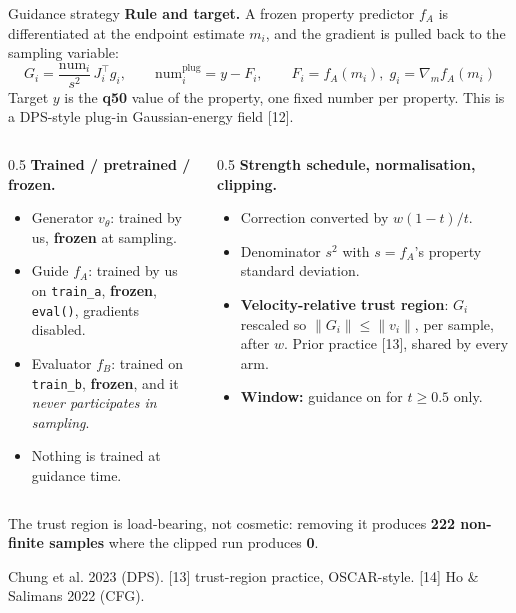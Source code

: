 \documentclass[aspectratio=169,10pt]{beamer}
\newcommand{\theslidelabel}{}
\newcommand{\lbl}[1]{\renewcommand{\theslidelabel}{#1}}
\newcommand{\srcs}[1]{\vfill{\raggedleft\color{grayt}\fontsize{4.9}{5.6}\selectfont #1\par}}
\newcommand{\take}[1]{\vspace{0.4ex}\colorbox{black!6}{\parbox{0.97\linewidth}{\footnotesize #1}}}
\begin{document}
\lbl{2b}
\begin{frame}{Guidance strategy}
  \textbf{Rule and target.} A frozen property predictor $f_A$ is differentiated at
  the endpoint estimate $m_i$, and the gradient is pulled back to the sampling
  variable:
  \[ G_i=\frac{\mathrm{num}_i}{s^2}\,J_i^{\!\top}g_i ,\qquad
     \mathrm{num}_i^{\mathrm{plug}} = y-F_i ,\qquad
     F_i=f_A(m_i),\; g_i=\nabla_m f_A(m_i) \]
  Target $y$ is the \textbf{q50} value of the property, one fixed number per
  property. This is a DPS-style plug-in Gaussian-energy field [12].

  \medskip
  \begin{columns}[T]
  \begin{column}{0.5\textwidth}
    \textbf{Trained / pretrained / frozen.}
    \begin{itemize}\setlength\itemsep{0.05em}
      \item Generator $v_\theta$: trained by us, \textbf{frozen} at sampling.
      \item Guide $f_A$: trained by us on \texttt{train\_a}, \textbf{frozen},
        \texttt{eval()}, gradients disabled.
      \item Evaluator $f_B$: trained on \texttt{train\_b}, \textbf{frozen}, and it
        \emph{never participates in sampling}.
      \item Nothing is trained at guidance time.
    \end{itemize}
  \end{column}
  \begin{column}{0.5\textwidth}
    \textbf{Strength schedule, normalisation, clipping.}
    \begin{itemize}\setlength\itemsep{0.05em}
      \item Correction converted by $w(1-t)/t$.
      \item Denominator $s^2$ with $s=f_A$'s property standard deviation.
      \item \textbf{Velocity-relative trust region}: $G_i$ rescaled so
        $\|G_i\|\le\|v_i\|$, per sample, after $w$. Prior practice [13], shared by
        every arm.
      \item \textbf{Window:} guidance on for $t\ge0.5$ only.
    \end{itemize}
  \end{column}
  \end{columns}

  \take{The trust region is load-bearing, not cosmetic: removing it produces
  \textbf{222 non-finite samples} where the clipped run produces \textbf{0}.}

  \srcs{[12] Chung et al. 2023 (DPS). [13] trust-region practice, OSCAR-style.
        [14] Ho \& Salimans 2022 (CFG).}
\end{frame}
\end{document}
